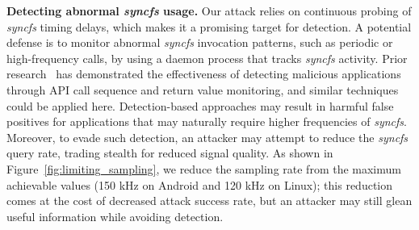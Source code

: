 \textbf{Detecting abnormal \textit{syncfs} usage.} Our attack relies on continuous probing of \textit{syncfs} timing delays, which makes it a promising target for detection. A potential defense is to monitor abnormal \textit{syncfs} invocation patterns, such as periodic or high-frequency calls, by using a daemon process that tracks \textit{syncfs} activity. Prior research~\cite{alazab2020intelligent, salehi2017maar} has demonstrated the effectiveness of detecting malicious applications through API call sequence and return value monitoring, and similar techniques~\cite{ensemblehmd} could be applied here. 
Detection-based approaches may result in harmful false positives for applications that may naturally require higher frequencies of \textit{syncfs}.  Moreover, to evade such detection, an attacker may attempt to reduce the \textit{syncfs} query rate, trading stealth for reduced signal quality. As shown in Figure~{\ref{fig:limiting_sampling}}, we reduce the sampling rate from the maximum achievable values (150 kHz on Android and 120 kHz on Linux); this reduction comes at the cost of decreased attack success rate, but an attacker may still glean useful information while avoiding detection.  %



